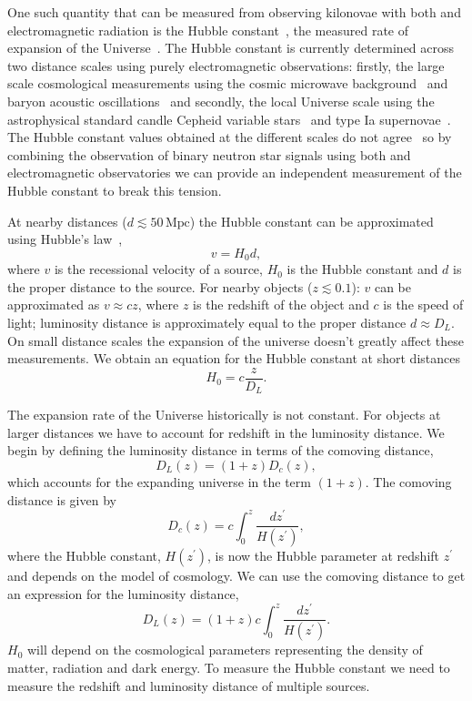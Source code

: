 One such quantity that can be measured from observing kilonovae with both \gws and electromagnetic radiation is the Hubble constant~\cite{Schutz:1986}, the measured rate of expansion of the Universe~\cite{hubble:1929}. The Hubble constant is currently determined across two distance scales using purely electromagnetic observations: firstly, the large scale cosmological measurements using the cosmic microwave background~\cite{WMAP_H0:2003} and baryon acoustic oscillations~\cite{BAO_H0:2009} and secondly, the local Universe scale using the astrophysical standard candle Cepheid variable stars~\cite{Cepheids_H0:2001} and type Ia supernovae~\cite{TypeIa_H0:1998}. The Hubble constant values obtained at the different scales do not agree~\cite{H0_tension:2020} so by combining the observation of binary neutron star signals using both \gw and electromagnetic observatories we can provide an independent measurement of the Hubble constant to break this tension.

At nearby distances ($d \lesssim 50 \, \text{Mpc}$) the Hubble constant can be approximated using Hubble's law~\cite{hubble:1929},
%
\begin{equation}
    v = H_{0} d,
    \label{6:eq:basic_hubbles_law}
\end{equation}
%
where $v$ is the recessional velocity of a source, $H_{0}$ is the Hubble constant and $d$ is the proper distance to the source. For nearby objects ($z \lesssim 0.1$): $v$ can be approximated as $v \approx cz$, where $z$ is the redshift of the object and $c$ is the speed of light; luminosity distance is approximately equal to the proper distance $d \approx D_{L}$. On small distance scales the expansion of the universe doesn't greatly affect these measurements. We obtain an equation for the Hubble constant at short distances
%
\begin{equation}
    H_{0} = c \frac{z}{D_{L}}.
    \label{6:eq:hubbles-law}
\end{equation}
%

The expansion rate of the Universe historically is not constant. For objects at larger distances we have to account for redshift in the luminosity distance. We begin by defining the luminosity distance in terms of the comoving distance,
%
\begin{equation}
    D_{L}(z) = (1 + z)D_{c}(z),
\end{equation}
%
which accounts for the expanding universe in the term $(1 + z)$. The comoving distance is given by
%
\begin{equation}
    D_{c}(z) = c \int^{z}_{0} \frac{dz^{\prime}}{H(z^{\prime})},
\end{equation}
%
where the Hubble constant, $H(z^{\prime})$, is now the Hubble parameter at redshift $z^{\prime}$ and depends on the model of cosmology.
We can use the comoving distance to get an expression for the luminosity distance,
%
\begin{equation}
    D_{L}(z) = (1 + z) c \int^{z}_{0} \frac{dz^{\prime}}{H(z^{\prime})}.
\end{equation}
%
$H_{0}$ will depend on the cosmological parameters representing the density of matter, radiation and dark energy. To measure the Hubble constant we need to measure the redshift and luminosity distance of multiple sources.

